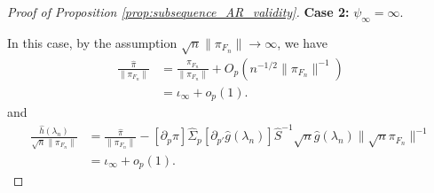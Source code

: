 \documentclass[11pt]{article}
\theoremstyle{definition}
\newcommand{\0}{\ensuremath{\mathbf{0}}}
\begin{document}
\begin{bibunit}
\begin{proof}[Proof of Proposition \ref{prop:subsequence_AR_validity}]
\medskip
\textbf{Case 2:} $\psi_\infty = \infty$.
\medskip

In this case, by the assumption $\sqrt{n}\|\pi_{F_n}\| \to \infty$, we have
\begin{equation}
\label{eq:limit_3}
\begin{aligned}
    \frac{\hat{\pi}}{\|\pi_{F_n}\|} 
    &= \frac{\pi_{F_n}}{\|\pi_{F_n}\|} + O_p(n^{-1/2}\|\pi_{F_n}\|^{-1}) \\
    &= \iota_\infty + o_p(1).
\end{aligned}
\end{equation}
and 
\begin{equation}
\label{eq:h_sqrt_limit}
\begin{aligned}
    \frac{\hat{h}(\lambda_n)}{\sqrt{n}\|\pi_{F_n}\|} 
    &= \frac{\hat{\pi}}{\|\pi_{F_n}\|} - [\partial_p \pi]\hat{\Sigma}_{p}[\partial_{p'} \hat{g}(\lambda_n)]\hat{S}^{-1}\sqrt{n}\hat{g}(\lambda_n) \|\sqrt{n}\pi_{F_n}\|^{-1} \\
    &= \iota_\infty + o_p(1).
\end{aligned}
\end{equation}


\end{proof}
\end{bibunit}
\end{document}
